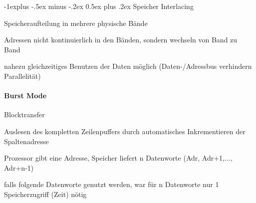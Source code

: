 \documentclass[10pt,landscape]{article}
\makeatletter
\renewcommand{\subsection}{\@startsection{subsection}{2}{0mm}%
                                {-1explus -.5ex minus -.2ex}%
                                {0.5ex plus .2ex}%
                                {\normalfont\normalsize\bfseries}}
\makeatother
\begin{document}
\begin{multicols}{3}
  \subsection{Speicher Interlacing}
  \begin{itemize*}
    \item Speicheraufteilung in mehrere physische Bände
    \item Adressen nicht kontinuierlich in den Bänden, sondern wechseln von Band zu Band
    \item nahezu gleichzeitiges Benutzen der Daten möglich (Daten-/Adressbus verhindern Parallelität)
  \end{itemize*}
  
  \paragraph{Burst Mode} Blocktransfer
  \begin{itemize*}
    \item Auslesen des kompletten Zeilenpuffers durch automatisches Inkrementieren der Spaltenadresse
    \item Prozessor gibt eine Adresse, Speicher liefert n Datenworte (Adr, Adr+1,..., Adr+n-1)
    \item falls folgende Datenworte genutzt werden, war für n Datenworte nur 1 Speicherzugriff (Zeit) nötig
  \end{itemize*}
  

\end{multicols}
\end{document}
